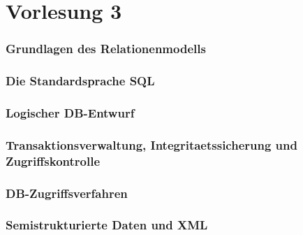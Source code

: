 \documentclass[a4paper,10pt]{article}
\begin{document}
\newpage
\part*{Vorlesung 3}
\section{Grundlagen des Relationenmodells}

\section{Die Standardsprache SQL}

\section{Logischer DB-Entwurf}

\section{Transaktionsverwaltung, Integritaetssicherung und Zugriffskontrolle}

\section{DB-Zugriffsverfahren}

\section{Semistrukturierte Daten und XML}
\end{document}
